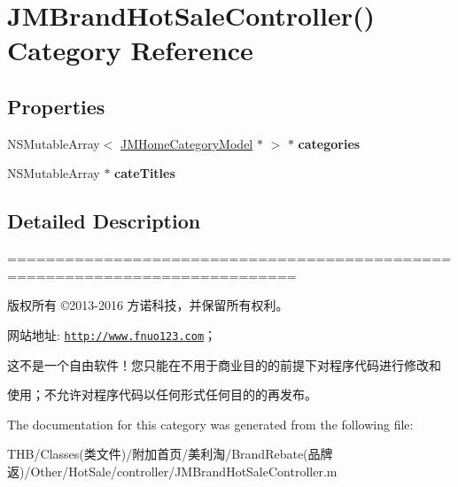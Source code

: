 \hypertarget{category_j_m_brand_hot_sale_controller_07_08}{}\section{J\+M\+Brand\+Hot\+Sale\+Controller() Category Reference}
\label{category_j_m_brand_hot_sale_controller_07_08}
\subsection*{Properties}
\begin{DoxyCompactItemize}
\item 
\mbox{\label{category_j_m_brand_hot_sale_controller_07_08_a22fdd935220944ddd9a9d7ec73017f97}} 
N\+S\+Mutable\+Array$<$ \mbox{\hyperlink{interface_j_m_home_category_model}{J\+M\+Home\+Category\+Model}} $\ast$ $>$ $\ast$ {\bfseries categories}
\item 
\mbox{\label{category_j_m_brand_hot_sale_controller_07_08_a84b02aec1c62b58bf5e69aa4ed3a8c98}} 
N\+S\+Mutable\+Array $\ast$ {\bfseries cate\+Titles}
\end{DoxyCompactItemize}


\subsection{Detailed Description}
============================================================================

版权所有 ©2013-\/2016 方诺科技，并保留所有权利。

网站地址\+: \href{http://www.fnuo123.com}{\tt http\+://www.\+fnuo123.\+com}； 



这不是一个自由软件！您只能在不用于商业目的的前提下对程序代码进行修改和

使用；不允许对程序代码以任何形式任何目的的再发布。 

 

The documentation for this category was generated from the following file\+:\begin{DoxyCompactItemize}
\item 
T\+H\+B/\+Classes(类文件)/附加首页/美利淘/\+Brand\+Rebate(品牌返)/\+Other/\+Hot\+Sale/controller/J\+M\+Brand\+Hot\+Sale\+Controller.\+m\end{DoxyCompactItemize}
